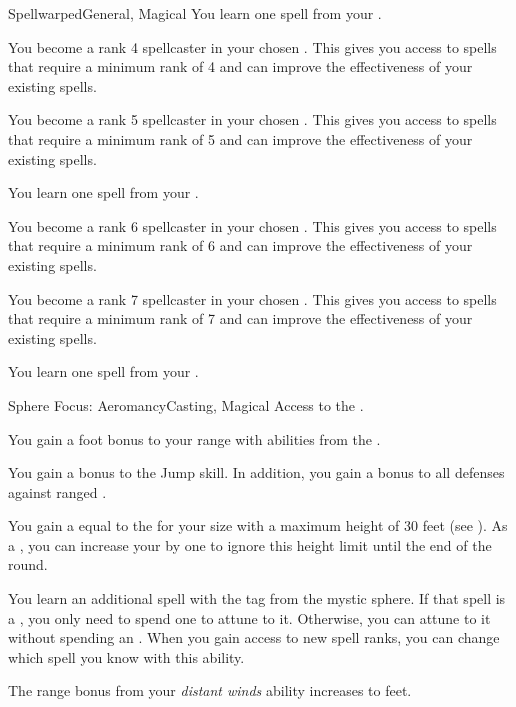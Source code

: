 \begin{feat}{Spellwarped}{General, Magical}
         You learn one spell from your .

         You become a rank 4 spellcaster in your chosen .
        This gives you access to spells that require a minimum rank of 4 and can improve the effectiveness of your existing spells.

         You become a rank 5 spellcaster in your chosen .
        This gives you access to spells that require a minimum rank of 5 and can improve the effectiveness of your existing spells.

         You learn one spell from your .

         You become a rank 6 spellcaster in your chosen .
        This gives you access to spells that require a minimum rank of 6 and can improve the effectiveness of your existing spells.

         You become a rank 7 spellcaster in your chosen .
        This gives you access to spells that require a minimum rank of 7 and can improve the effectiveness of your existing spells.

         You learn one spell from your .
    \end{feat}

    \begin{feat}{Sphere Focus: Aeromancy}{Casting, Magical}
        \featpre Access to the  .

         You gain a  foot bonus to your range with abilities from the  .

         You gain a  bonus to the Jump skill.
        In addition, you gain a  bonus to all defenses against ranged .

         You gain a  equal to the  for your size with a maximum height of 30 feet (see ).
        As a , you can increase your  by one to ignore this height limit until the end of the round.

         You learn an additional spell with the  tag from the  mystic sphere.
        If that spell is a , you only need to spend one  to attune to it.
        Otherwise, you can attune to it without spending an .
        When you gain access to new spell ranks, you can change which spell you know with this ability.

         The range bonus from your \textit{distant winds} ability increases to  feet.
    \end{feat}

